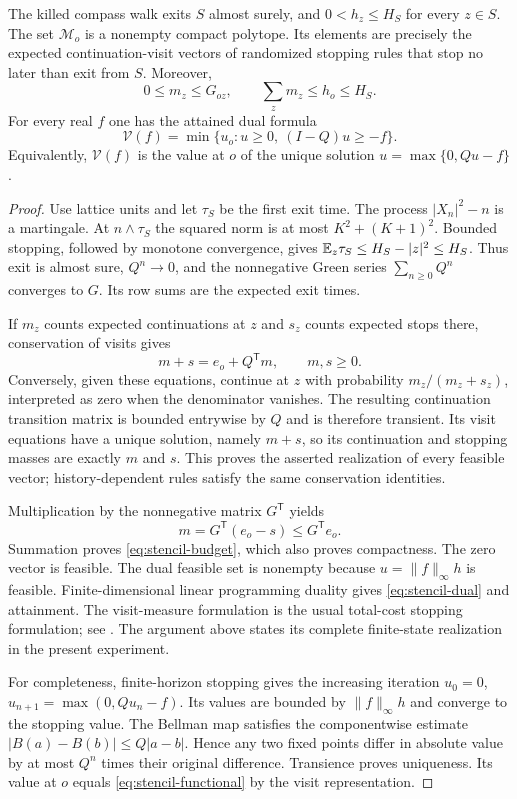 \begin{lemma}
\label{lem:stencil-polytope}
The killed compass walk exits $S$ almost surely, and
$0<h_z\le H_S$ for every $z\in S$. The set $\mathcal M_o$ is a
nonempty compact polytope. Its elements are precisely the expected
continuation-visit vectors of randomized stopping rules that stop no
later than exit from $S$. Moreover,
\begin{equation}\label{eq:stencil-budget}
 0\le m_z\le G_{oz},\qquad \sum_zm_z\le h_o\le H_S.
\end{equation}
For every real $f$ one has the attained dual formula
\begin{equation}\label{eq:stencil-dual}
 \mathcal V(f)=
 \min\{u_o:u\ge0,\ (I-Q)u\ge-f\}.
\end{equation}
Equivalently, $\mathcal V(f)$ is the value at $o$ of the unique
solution $u=\max\{0,Qu-f\}$.
\end{lemma}
\begin{proof}
Use lattice units and let $\tau_S$ be the first exit time. The process
$|X_n|^2-n$ is a martingale. At $n\wedge\tau_S$ the squared norm is
at most $K^2+(K+1)^2$. Bounded stopping, followed by monotone
convergence, gives
$\mathbb E_z\tau_S\le H_S-|z|^2\le H_S$. Thus exit is almost sure,
$Q^n\to0$, and the nonnegative Green series $\sum_{n\ge0}Q^n$
converges to $G$. Its row sums are the expected exit times.

If $m_z$ counts expected continuations at $z$ and $s_z$ counts
expected stops there, conservation of visits gives
\[
                 m+s=e_o+Q^{\mathsf T}m,\qquad m,s\ge0.
\]
Conversely, given these equations, continue at $z$ with probability
$m_z/(m_z+s_z)$, interpreted as zero when the denominator vanishes.
The resulting continuation transition matrix is bounded entrywise by
$Q$ and is therefore transient. Its visit equations have a unique
solution, namely $m+s$, so its continuation and stopping masses are
exactly $m$ and $s$. This proves the asserted realization of every
feasible vector; history-dependent rules satisfy the same conservation
identities.

Multiplication by the nonnegative matrix $G^{\mathsf T}$ yields
\[
             m=G^{\mathsf T}(e_o-s)\le G^{\mathsf T}e_o.
\]
Summation proves \eqref{eq:stencil-budget}, which also proves
compactness. The zero vector is feasible. The dual feasible set is
nonempty because $u=\|f\|_\infty h$ is feasible. Finite-dimensional
linear programming duality gives \eqref{eq:stencil-dual} and attainment.
The visit-measure formulation is the usual total-cost stopping
formulation; see \cite{Altman}. The argument above states its complete
finite-state realization in the present experiment.

For completeness, finite-horizon stopping gives the increasing
iteration $u_0=0$, $u_{n+1}=\max(0,Qu_n-f)$. Its values are bounded
by $\|f\|_\infty h$ and converge to the stopping value. The Bellman
map satisfies the componentwise estimate
$|B(a)-B(b)|\le Q|a-b|$. Hence any two fixed points differ in
absolute value by at most $Q^n$ times their original difference.
Transience proves uniqueness. Its value at $o$ equals
\eqref{eq:stencil-functional} by the visit representation.
\end{proof}

